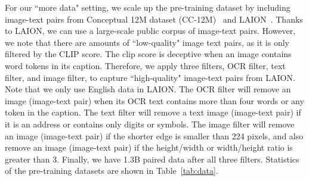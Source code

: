 \documentclass[11pt]{article}
\begin{document}
For our ``more data" setting, we scale up the pre-training dataset by including image-text pairs from Conceptual 12M dataset (CC-12M)~\cite{changpinyo2021conceptual} and LAION~\cite{schuhmann2022laion}. Thanks to LAION, we can use a large-scale public corpus of image-text pairs. However, we note that there are amounts of ``low-quality" image text pairs, as it is only filtered by the CLIP score. The clip score is deceptive when an image contains word tokens in its caption. Therefore, we apply three filters, OCR filter, text filter, and image filter, to capture ``high-quality" image-text pairs from LAION. Note that we only use English data in LAION.
The OCR filter will remove an image (image-text pair) when its OCR text contains more than four words or any token in the caption.
The text filter will remove a text image (image-text pair) if it is an address or contains only digits or symbols. The image filter will remove an image (image-text pair) if the shorter edge is smaller than 224 pixels, and also remove an image (image-text pair) if the height/width or width/height ratio is greater than 3. Finally, we have 1.3B paired data after all three filters. Statistics of the pre-training datasets are shown in Table~\ref{tab:data}.

\begin{table}[ht]
\small
\centering	
{}
\vspace{0.2cm}
\caption
{
Statistics of the pre-training datasets. 
}
\label{tab:data}
\end{table}
\end{document}
